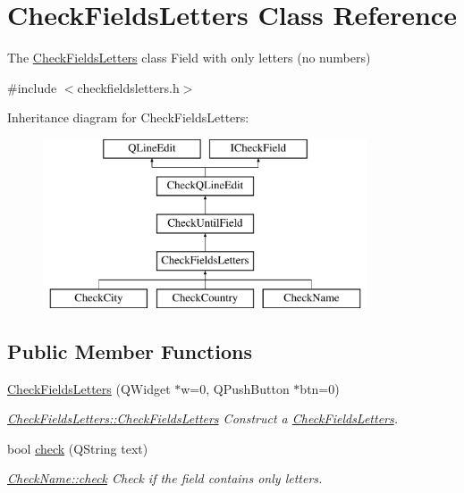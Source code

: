 \hypertarget{classCheckFieldsLetters}{\section{Check\-Fields\-Letters Class Reference}
\label{classCheckFieldsLetters}
}


The \hyperlink{classCheckFieldsLetters}{Check\-Fields\-Letters} class Field with only letters (no numbers)  




{\ttfamily \#include $<$checkfieldsletters.\-h$>$}

Inheritance diagram for Check\-Fields\-Letters\-:\begin{figure}[H]
\begin{center}
\leavevmode
\includegraphics[height=5.000000cm]{de/d19/classCheckFieldsLetters}
\end{center}
\end{figure}
\subsection*{Public Member Functions}
\begin{DoxyCompactItemize}
\item 
\hyperlink{classCheckFieldsLetters_a5a8af8c6e89dc19c7e98304e5f40081d}{Check\-Fields\-Letters} (Q\-Widget $\ast$w=0, Q\-Push\-Button $\ast$btn=0)
\begin{DoxyCompactList}\small\item\em \hyperlink{classCheckFieldsLetters_a5a8af8c6e89dc19c7e98304e5f40081d}{Check\-Fields\-Letters\-::\-Check\-Fields\-Letters} Construct a \hyperlink{classCheckFieldsLetters}{Check\-Fields\-Letters}. \end{DoxyCompactList}\item 
bool \hyperlink{classCheckFieldsLetters_a62574deb407fe83456e46381425a7b46}{check} (Q\-String text)
\begin{DoxyCompactList}\small\item\em \hyperlink{classCheckFieldsLetters_a62574deb407fe83456e46381425a7b46}{Check\-Name\-::check} Check if the field contains only letters. \end{DoxyCompactList}\end{DoxyCompactItemize}
